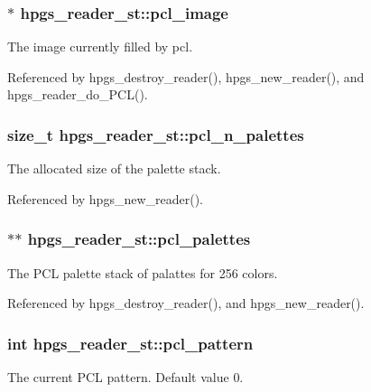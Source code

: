 \subsubsection[{pcl\_\-image}]{$\ast$ {\bf hpgs\_\-reader\_\-st::pcl\_\-image}}\label{structhpgs__reader__st_ae63839dcbee1b611dc6395e0ad1dbb3e}
The image currently filled by pcl. 

Referenced by hpgs\_\-destroy\_\-reader(), hpgs\_\-new\_\-reader(), and hpgs\_\-reader\_\-do\_\-PCL().

\subsubsection[{pcl\_\-n\_\-palettes}]{\setlength{\rightskip}{0pt plus 5cm}size\_\-t {\bf hpgs\_\-reader\_\-st::pcl\_\-n\_\-palettes}}\label{structhpgs__reader__st_a0e0acf2acb5b1faaeb1fde401c03f562}
The allocated size of the palette stack. 

Referenced by hpgs\_\-new\_\-reader().

\subsubsection[{pcl\_\-palettes}]{$\ast$$\ast$ {\bf hpgs\_\-reader\_\-st::pcl\_\-palettes}}\label{structhpgs__reader__st_a0c384bda72a671d8f77975019e138847}
The PCL palette stack of palattes for 256 colors. 

Referenced by hpgs\_\-destroy\_\-reader(), and hpgs\_\-new\_\-reader().

\subsubsection[{pcl\_\-pattern}]{\setlength{\rightskip}{0pt plus 5cm}int {\bf hpgs\_\-reader\_\-st::pcl\_\-pattern}}\label{structhpgs__reader__st_acf671880c6c1ae59c925349d9da5ba66}
The current PCL pattern. Default value 0. 
